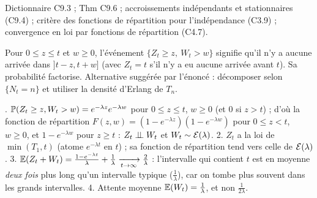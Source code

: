 \documentclass[11pt,a4paper]{article}
\begin{document}
\begin{exo}
\outils Dictionnaire C9.3 ; Thm C9.6 ; accroissements indépendants et stationnaires (C9.4) ; critère des fonctions de répartition pour
l'indépendance (C3.9) ; convergence en loi par fonctions de répartition (C4.7).

\meth Pour $0\le z\le t$ et $w\ge0$, l'événement $\{Z_t\ge z,\ W_t>w\}$ signifie qu'il n'y a aucune arrivée dans $]t-z,t+w]$
(avec $Z_t=t$ s'il n'y a eu aucune arrivée avant $t$). Sa probabilité factorise. Alternative suggérée par l'énoncé : décomposer selon
$\{N_t=n\}$ et utiliser la densité d'Erlang de $T_n$.

. $\mathbb{P}(Z_t\ge z,W_t>w)=e^{-\lambda z}e^{-\lambda w}$ pour $0\le z\le t$, $w\ge0$ (et $0$ si $z>t$) ; d'où la fonction de répartition $F(z,w)=(1-e^{-\lambda z})(1-e^{-\lambda w})$ pour $0\le z<t$, $w\ge0$, et $1-e^{-\lambda w}$ pour $z\ge t$ : $Z_t\perp\!\!\!\perp W_t$ et $W_t\sim\mathcal{E}(\lambda)$.
2. $Z_t$ a la loi de $\min(T_1,t)$ (atome $e^{-\lambda t}$ en $t$) ; sa fonction de répartition tend vers celle de $\mathcal{E}(\lambda)$.
3. $\mathbb{E}(Z_t+W_t)=\frac{1-e^{-\lambda t}}{\lambda}+\frac1\lambda\xrightarrow[t\to\infty]{}\frac2\lambda$ : l'intervalle qui contient $t$ est en moyenne
\emph{deux fois} plus long qu'un intervalle typique ($\frac1\lambda$), car on tombe plus souvent dans les grands intervalles.
4. Attente moyenne $\mathbb{E}(W_t)=\frac1\lambda$, et non $\frac1{2\lambda}$.
\end{exo}
\end{document}
